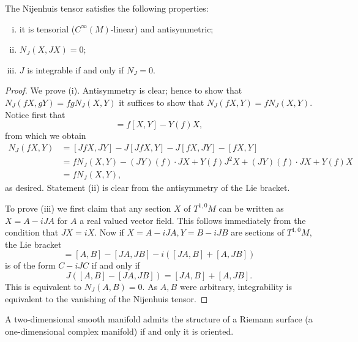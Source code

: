 \documentclass{amsart}
\begin{document}
\begin{lemma}
    The Nijenhuis tensor satisfies the following properties:
    \begin{enumerate}[(i)]
        \item it is tensorial ($C^\infty(M)$-linear) and antisymmetric;
        \item $N_J(X, JX)=0$;
        \item $J$ is integrable if and only if $N_J=0$.
    \end{enumerate}
\end{lemma}
\begin{proof}
    We prove (i). Antisymmetry is clear; hence to show that $N_J(fX,gY)=fgN_J(X,Y)$ it suffices to show
    that $N_J(fX,Y)=fN_J(X,Y)$. Notice first that
    \begin{equation*}
        [fX, Y] = f[X,Y] - Y(f)X,
    \end{equation*}
    from which we obtain
    \begin{align*}
        N_J(fX,Y) &= [JfX, JY] - J[JfX,Y] - J[fX,JY] - [fX,Y]\\
        &= fN_J(X,Y) - (JY)(f)\cdot JX + Y(f)J^2X + (JY)(f)\cdot JX + Y(f)X\\
        &= fN_J(X,Y),
    \end{align*}
    as desired. Statement (ii) is clear from the antisymmetry of the Lie bracket.

    To prove (iii) we first claim that any section $X$ of $T^{1,0}M$ can be written as
    $X=A-iJA$ for $A$ a real valued vector field. This follows immediately from the condition
    that $JX=iX$. Now if $X=A-iJA,Y=B-iJB$ are sections of $T^{1,0}M$, the Lie bracket
    \begin{equation*}
        [A-iJA, B-iJB] = [A,B] - [JA, JB] - i\left( [JA,B]+[A,JB] \right)
    \end{equation*}
    is of the form $C-iJC$ if and only if
    \begin{equation*}
        J([A,B] - [JA, JB]) = [JA,B] + [A,JB].
    \end{equation*}
    This is equivalent to $N_J(A,B)=0$. As $A,B$ were arbitrary, integrability is equivalent
    to the vanishing of the Nijenhuis tensor.
\end{proof}

\begin{proposition}
    A two-dimensional smooth manifold admits the structure of a Riemann surface (a one-dimensional
    complex manifold) if and only it is oriented.
    \label{proposition:rs}
\end{proposition}
\end{document}
